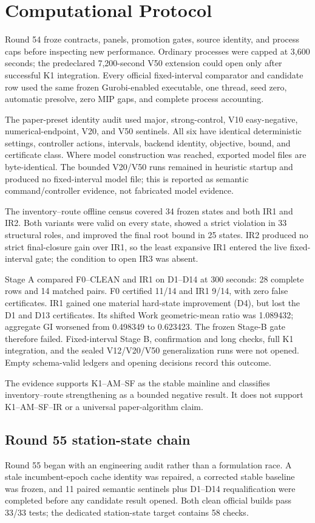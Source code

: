 \section{Computational Protocol}
Round 54 froze contracts, panels, promotion gates, source identity, and process
caps before inspecting new performance. Ordinary processes were capped at
3,600 seconds; the predeclared 7,200-second V50 extension could open only after
successful K1 integration. Every official fixed-interval comparator and
candidate row used the same frozen Gurobi-enabled executable, one thread, seed
zero, automatic presolve, zero MIP gaps, and complete process accounting.

The paper-preset identity audit used major, strong-control, V10 easy-negative,
numerical-endpoint, V20, and V50 sentinels. All six have identical deterministic
settings, controller actions, intervals, backend identity, objective, bound,
and certificate class. Where model construction was reached, exported model
files are byte-identical. The bounded V20/V50 runs remained in heuristic
startup and produced no fixed-interval model file; this is reported as
semantic command/controller evidence, not fabricated model evidence.

The inventory--route offline census covered 34 frozen states and both IR1 and
IR2. Both variants were valid on every state, showed a strict violation in 33
structural roles, and improved the final root bound in 25 states. IR2 produced
no strict final-closure gain over IR1, so the least expansive IR1 entered the
live fixed-interval gate; the condition to open IR3 was absent.

Stage A compared F0--CLEAN and IR1 on D1--D14 at 300 seconds: 28 complete rows
and 14 matched pairs. F0 certified 11/14 and IR1 9/14, with zero false
certificates. IR1 gained one material hard-state improvement (D4), but lost
the D1 and D13 certificates. Its shifted Work geometric-mean ratio was
1.089432; aggregate GI worsened from 0.498349 to 0.623423. The frozen Stage-B
gate therefore failed. Fixed-interval Stage B, confirmation and long checks,
full K1 integration, and the sealed V12/V20/V50 generalization runs were not
opened. Empty schema-valid ledgers and opening decisions record this outcome.

The evidence supports K1--AM--SF as the stable mainline and classifies
inventory--route strengthening as a bounded negative result. It does not
support K1--AM--SF--IR or a universal paper-algorithm claim.

\subsection{Round 55 station-state chain}
Round 55 began with an engineering audit rather than a formulation race. A
stale incumbent-epoch cache identity was repaired, a corrected stable baseline
was frozen, and 11 paired semantic sentinels plus D1--D14 requalification were
completed before any candidate result opened. Both clean official builds pass
33/33 tests; the dedicated station-state target contains 58 checks.

